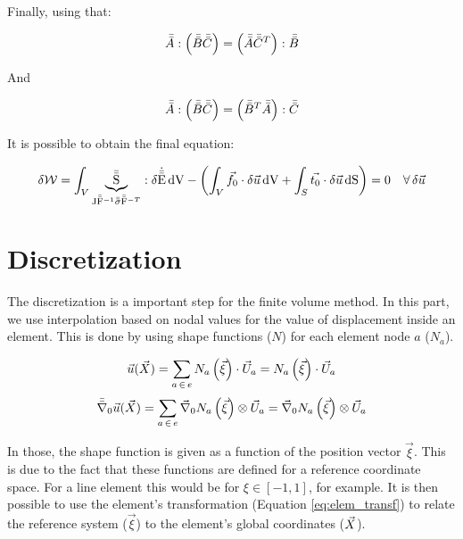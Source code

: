 Finally, using that:

\begin{equation*}
    \bar{\bar{A}} : \left( \bar{\bar{B}} \bar{\bar{C}} \right) = \left( \bar{\bar{A}} \bar{\bar{C}}^T \right) : \bar{\bar{B}}
\end{equation*}

And 

\begin{equation*}
    \bar{\bar{A}} : \left( \bar{\bar{B}} \bar{\bar{C}} \right) = \left( \bar{\bar{B}}^T \bar{\bar{A}} \right) : \bar{\bar{C}}
\end{equation*}

It is possible to obtain the final equation:

\begin{equation} \label{eq:wf_pk2}
    \delta \mathcal{W} = \int_V \underbrace{\bar{\bar{\mathrm{S}}}}_{\mathrm{J} \bar{\bar{\mathrm{F}}}^{-1} \bar{\bar{\sigma}} \bar{\bar{\mathrm{F}}}^{-T}} : \delta \dot{\bar{\bar{\mathrm{E}}}} \, \mathrm{dV} - \left( \int_V \vec{f_0} \cdot \delta \vec{u} \, \mathrm{dV} + \int_S \vec{t_0} \cdot \delta \vec{u} \, \mathrm{dS} \right) = 0 \quad \forall \, \delta \vec{u} 
\end{equation}

\section{Discretization}

The discretization is a important step for the finite volume method. In this part, we use interpolation based on nodal values for the value of displacement inside an element. This is done by using shape functions ($N$) for each element node $a$ ($N_a$).

\begin{equation} \label{eq:disc_u}
    \vec{u} (\vec{X}) = \sum_{a \, \in \, e} N_a \left(\vec{\xi} \right) \cdot \vec{U}_a = N_a \left(\vec{\xi} \right) \cdot \vec{U}_a
\end{equation}
\begin{equation} \label{eq:disc_grad0_u}
    \bar{\bar{\nabla}}_\mathrm{0} \vec{u} (\vec{X}) = \sum_{a \, \in \, e} \vec{\nabla}_\mathrm{0} N_a \left(\vec{\xi} \right) \otimes \vec{U}_a = \vec{\nabla}_\mathrm{0} N_a \left(\vec{\xi} \right) \otimes \vec{U}_a
\end{equation}

In those, the shape function is given as a function of the position vector $\vec{\xi}$. This is due to the fact that these functions are defined for a reference coordinate space. For a line element this would be for $\xi \in [-1, 1]$, for example. It is then possible to use the element's transformation (Equation \ref{eq:elem_transf}) to relate the reference system ($\vec{\xi}$) to the element's global coordinates ($\vec{X}$).

